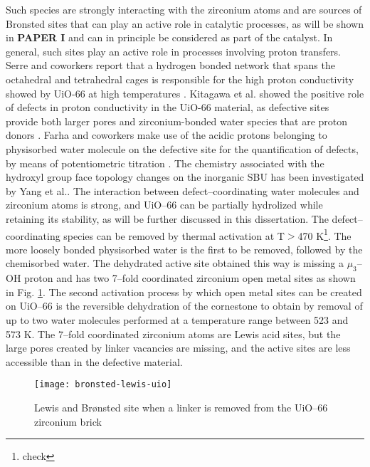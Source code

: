 Such species are strongly interacting with the zirconium atoms and are sources of Bronsted sites that can play an active role in catalytic processes, as will be shown in \textbf{PAPER I} and can in principle be considered as part of the catalyst.
In general, such sites play an active role in processes involving proton transfers. Serre and coworkers report that a hydrogen bonded network that spans the octahedral and tetrahedral cages is responsible for the high proton conductivity showed by UiO-66 at high temperatures \cite{borges2016proton}. Kitagawa et al. showed the positive role of defects in proton conductivity in the UiO-66 material, as defective sites provide both larger pores and zirconium-bonded water species that are proton donors \cite{taylor2015defect}. Farha and coworkers make use of the acidic protons belonging to physisorbed water molecule on the defective site for the quantification of defects, by means of potentiometric titration \cite{klet2016evaluation}. The chemistry associated with the hydroxyl group face topology changes on the inorganic SBU has been investigated by Yang et al.\cite{yang2016tuning}. The interaction between defect--coordinating water molecules and zirconium atoms is strong, and UiO--66 can be partially hydrolized\cite{decoste2013stability} while retaining its stability, as will be further discussed in this dissertation.
\npar
The defect--coordinating species can be removed by thermal activation at T$>$470 K\footnote{check}. The more loosely bonded physisorbed water is the first to be removed, followed by the chemisorbed water. The dehydrated active site obtained this way is missing a $\mu_{3}$--OH proton and has two 7--fold coordinated zirconium open metal sites as shown in Fig. \ref{fig:bronsted-lewis-uio}. 
\npar
The second activation process by which open metal sites can be created on UiO--66 is the reversible dehydration of the  cornestone to obtain  by removal of up to two water molecules performed at a temperature range between 523 and 573 K. The 7--fold coordinated zirconium atoms are Lewis acid sites, but the large pores created by linker vacancies are missing, and the active sites are less accessible than in the defective material. 
\begin{figure}[!htbp]
	\centering
 	\texttt{[image: bronsted-lewis-uio]}
	\caption{Lewis and Br\o{}nsted site when a linker is removed from the UiO--66 zirconium brick}
	\label{fig:bronsted-lewis-uio}
\end{figure}
